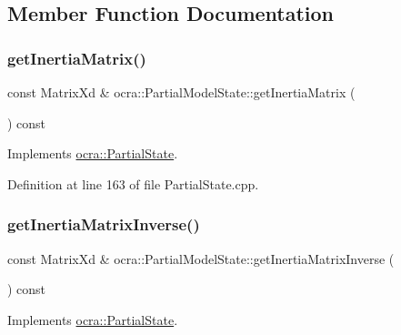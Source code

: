 \subsection{Member Function Documentation}
\hypertarget{classocra_1_1PartialModelState_a9fe03ab8c3c4afe56ee4b59f96ac4a25}{}\label{classocra_1_1PartialModelState_a9fe03ab8c3c4afe56ee4b59f96ac4a25} 
\subsubsection{\texorpdfstring{get\+Inertia\+Matrix()}{getInertiaMatrix()}}
{\footnotesize\ttfamily const Matrix\+Xd \& ocra\+::\+Partial\+Model\+State\+::get\+Inertia\+Matrix (\begin{DoxyParamCaption}{ }\end{DoxyParamCaption}) const\hspace{0.3cm}{\ttfamily [virtual]}}



Implements \hyperlink{classocra_1_1PartialState_ad811a25932f0fad439242ebd48841162}{ocra\+::\+Partial\+State}.



Definition at line 163 of file Partial\+State.\+cpp.

\hypertarget{classocra_1_1PartialModelState_a664e4f70861eefde844dca6dd09a2213}{}\label{classocra_1_1PartialModelState_a664e4f70861eefde844dca6dd09a2213} 
\subsubsection{\texorpdfstring{get\+Inertia\+Matrix\+Inverse()}{getInertiaMatrixInverse()}}
{\footnotesize\ttfamily const Matrix\+Xd \& ocra\+::\+Partial\+Model\+State\+::get\+Inertia\+Matrix\+Inverse (\begin{DoxyParamCaption}{ }\end{DoxyParamCaption}) const\hspace{0.3cm}{\ttfamily [virtual]}}



Implements \hyperlink{classocra_1_1PartialState_a83979e39dd3631861c724514e49cb8b4}{ocra\+::\+Partial\+State}.



